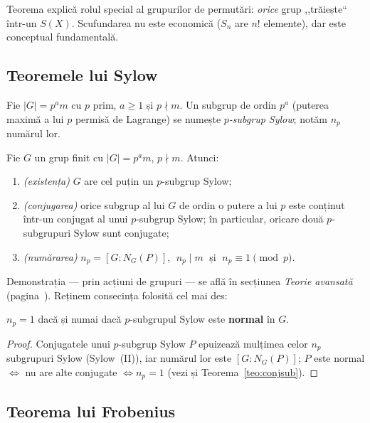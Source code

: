 \begin{observatie}
Teorema explică rolul special al grupurilor de permutări: \emph{orice} grup ,,trăiește`` într-un $S(X)$. Scufundarea nu este economică ($S_n$ are $n!$ elemente), dar este conceptual fundamentală.
\end{observatie}

\subsection*{Teoremele lui Sylow}

Fie $|G|=p^a m$ cu $p$ prim, $a\ge1$ și $p\nmid m$. Un subgrup de ordin $p^a$ (puterea maximă a lui $p$ permisă de Lagrange) se numește \emph{$p$-subgrup Sylow}; notăm $n_p$ numărul lor.

\begin{teorema}[Sylow]\label{teo:sylow}
Fie $G$ un grup finit cu $|G|=p^am$, $p\nmid m$. Atunci:
\begin{enumerate}[label=\emph{(\Roman*)},nosep,leftmargin=2.2em]
\item \emph{(existența)} $G$ are cel puțin un $p$-subgrup Sylow;
\item \emph{(conjugarea)} orice subgrup al lui $G$ de ordin o putere a lui $p$ este conținut într-un conjugat al unui $p$-subgrup Sylow; în particular, oricare două $p$-subgrupuri Sylow sunt conjugate;
\item \emph{(numărarea)} $n_p=[G:N_G(P)]$, $\;n_p\mid m\;$ și $\;n_p\equiv1\pmod p$.
\end{enumerate}
\end{teorema}

Demonstrația --- prin acțiuni de grupuri --- se află în secțiunea \emph{Teorie avansată} (pagina~\pageref{dem:sylow}). Reținem consecința folosită cel mai des:

\begin{corolar}\label{cor:sylownormal}
$n_p=1$ dacă și numai dacă $p$-subgrupul Sylow este \textbf{normal} în $G$.
\end{corolar}

\begin{proof}
Conjugatele unui $p$-subgrup Sylow $P$ epuizează mulțimea celor $n_p$ subgrupuri Sylow (Sylow~(II)), iar numărul lor este $[G:N_G(P)]$; $P$ este normal $\iff$ nu are alte conjugate $\iff n_p=1$ (vezi și Teorema~\ref{teo:conjsub}).
\end{proof}

\subsection*{Teorema lui Frobenius}

